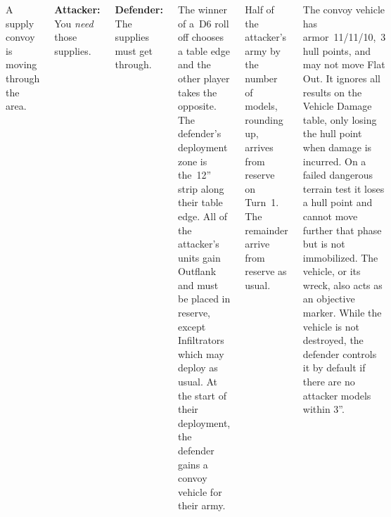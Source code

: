 
\begin{columns}

A supply convoy is moving through the area.

  {\bf Attacker:} You \emph{need} those supplies.

  {\bf Defender:} The supplies must get through.

%

The winner of a~D6 roll off chooses a table edge and the other player
takes the opposite.  The defender's deployment zone is the~12'' strip
along their table edge.  All of the attacker's units gain Outflank and
must be placed in reserve, except Infiltrators which may deploy as
usual.  At the start of their deployment, the defender gains a convoy
vehicle for their army.


%


Half of the attacker's army by the number of models, rounding up,
arrives from reserve on Turn~1.  The remainder arrive from reserve as
usual.

The convoy vehicle has armor~11/11/10,~3 hull points, and may not move
Flat Out.  It ignores all results on the Vehicle Damage table, only
losing the hull point when damage is incurred.  On a failed dangerous
terrain test it loses a hull point and cannot move further that phase
but is not immobilized.  The vehicle, or its wreck, also acts as an
objective marker.  While the vehicle is not destroyed, the defender
controls it by default if there are no attacker models within 3''.



%
%
%


\end{columns}
